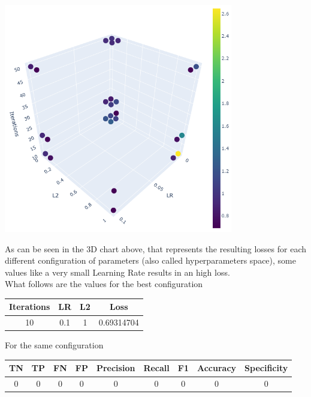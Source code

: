 \documentclass[
	letterpaper, %
	10pt, %
]{class}
\begin{document}
\begin{center}
    \includegraphics[width=10cm]{../images/3d.png}
\end{center}

As can be seen in the 3D chart above, that represents the resulting losses for each different configuration of parameters (also called hyperparameters space), some values like a very small Learning Rate results in an high loss.\\
What follows are the values for the best configuration

\begin{center}
    \begin{tabular}{ |c|c|c|c| }
        \hline
        Iterations & LR  & L2 & Loss       \\
        \hline
        10         & 0.1 & 1  & 0.69314704 \\
        \hline
    \end{tabular}
\end{center}

For the same configuration

\begin{center}
    \begin{tabular}{ |c|c|c|c|c|c|c|c|c| }
        \hline
        TN & TP & FN & FP & Precision & Recall & F1 & Accuracy & Specificity \\
        \hline
        0  & 0  & 0  & 0  & 0         & 0      & 0  & 0        & 0           \\
        \hline
    \end{tabular}
\end{center}
\end{document}
